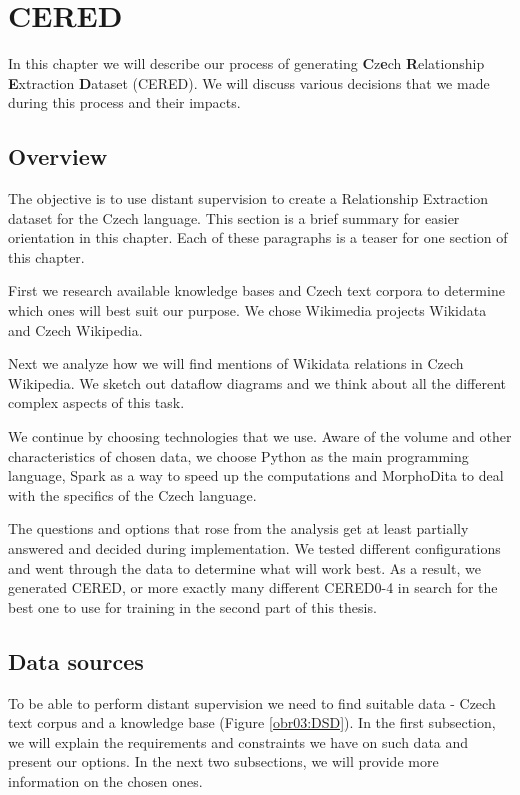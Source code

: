 \chapter{CERED}

In this chapter we will describe our process of generating \textbf{C}z\textbf{e}ch \textbf{R}elationship \textbf{E}xtraction \textbf{D}ataset (CERED). We will discuss various decisions that we made during this process and their impacts.


\section{Overview}

The objective is to use distant supervision to create a Relationship Extraction dataset for the Czech language. This section is a brief summary for easier orientation in this chapter. Each of these paragraphs is a teaser for one section of this chapter.

First we research available knowledge bases and Czech text corpora to determine which ones will best suit our purpose. We chose Wikimedia projects Wikidata and Czech Wikipedia.

Next we analyze how we will find mentions of Wikidata relations in Czech Wikipedia. We sketch out dataflow diagrams and we think about all the different complex aspects of this task.

We continue by choosing technologies that we use. Aware of the volume and other characteristics of chosen data, we choose Python as the main programming language, Spark as a way to speed up the computations and MorphoDita to deal with the specifics of the Czech language.

The questions and options that rose from the analysis get at least partially answered and decided during implementation. We tested different configurations and went through the data to determine what will work best. As a result, we generated CERED, or more exactly many different CERED0-4 in search for the best one to use for training in the second part of this thesis. 



\section{Data sources}

To be able to perform distant supervision we need to find suitable data - Czech text corpus and a knowledge base (Figure \ref{obr03:DSD}). In the first subsection, we will explain the requirements and constraints we have on such data and present our options. In the next two subsections, we will provide more information on the chosen ones.

